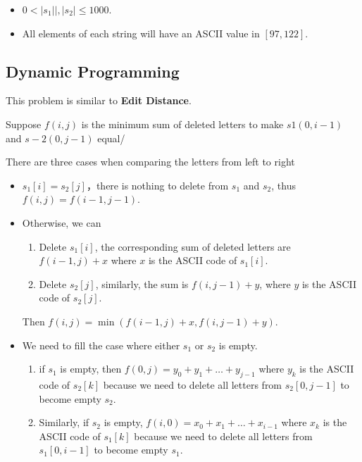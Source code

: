 \begin{itemize}
\item $0 < \lvert s_1\rvert|, \lvert s_2\rvert \leq 1000$.
\item All elements of each string will have an ASCII value in $[97, 122]$.
\end{itemize}

\subsection{Dynamic Programming}
This problem is similar to \textbf{Edit Distance}.

Suppose $f(i,j)$ is the minimum sum of deleted letters to make $s1(0, i-1)$ and $s-2(0, j-1)$ equal/

There are three cases when comparing the letters from left to right
\begin{itemize}
\item $s_1[i] = s_2[j]$，there is nothing to delete from $s_1$ and $s_2$, thus $f(i,j) = f(i-1,j-1)$.

\item Otherwise, we can
\begin{enumerate}
\item Delete $s_1[i]$, the corresponding sum of deleted letters are $f(i-1,j) + x$ where $x$ is the ASCII code of $s_1[i]$.

\item Delete $s_2[j]$, similarly, the sum is $f(i, j-1) + y$, where $y$ is the ASCII code of $s_2[j]$.
\end{enumerate}

Then $f(i, j)=\min(f(i-1,j)+x, f(i,j-1)+y)$.

\item We need to fill the case where either $s_1$ or $s_2$ is empty.

\begin{enumerate}
\item if $s_1$ is empty, then $f(0,j) = y_0+y_1+\ldots+y_{j-1}$ where $y_{k}$ is the ASCII code of $s_2[k]$ because we need to delete all letters from $s_2[0,j-1]$ to become empty $s_2$.

\item Similarly, if $s_2$ is empty, $f(i,0)=x_0+x_1+\ldots+x_{i-1}$ where $x_{k}$ is the ASCII code of $s_1[k]$ because we need to delete all letters from $s_1[0,i-1]$ to become empty $s_1$.
\end{enumerate}

\end{itemize}

